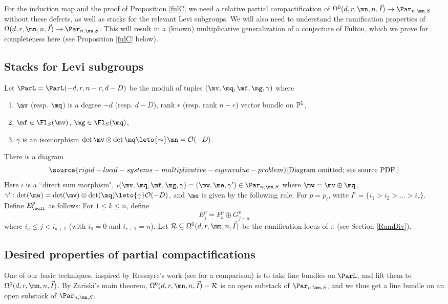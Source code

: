For the induction map and the proof of Proposition \ref{fulC} we need a relative
partial compactification of $\Omega^0(d,r,\mn,n,\vec{I})\to \Par_{n,\mn,S}$ without these defects, as well as stacks for the relevant Levi subgroups. We will also need to understand the ramification properties of $\Omega(d,r,\mn,n,\vec{I})\to \Par_{n,\mn,S}$.  This will result in a (known) multiplicative generalization of a conjecture of Fulton, which we prove for completeness here (see Proposition \ref{fulC} below).



\subsection{Stacks for Levi subgroups}
\begin{defi}
\notready\label{parul}
Let $\ParL=\ParL(-d,r,n-r,d-D)$ be the moduli of tuples $(\mv,\mq,\mf,\mg,\gamma)$ where
\begin{enumerate}
\item $\mv$ (resp. $\mq$) is a degree $-d$ (resp. $d-D$), rank $r$ (resp. rank $n-r$) vector bundle on $\Bbb{P}^1$,
\item  $\mf\in \Fl_S(\mv)$, $\mg\in \Fl_S(\mq)$,
\item $\gamma$ is an isomorphism $\det \mv\otimes \det\mq\leto{\sim}\mn=\mathcal{O}(-D)$.
\end{enumerate}
\end{defi}
There is a diagram
\begin{equation}\label{Dbasic}
\source{rigid-local-systems-multiplicative-eigenvalue-problem}
\text{[Diagram omitted; see source PDF.]}
\end{equation}
Here $i$ is a ``direct sum morphism", $i(\mv,\mq,\mf,\mg,\gamma)= (\mw,\me,\gamma')\in \Par_{n,\mn,S}$ where $\mw=\mv\oplus\mq$, $\gamma': \det(\mw)=\det(\mv)\otimes\det(\mq)\leto{\gamma} \mathcal{O}(-D)$, and $\me$ is given by the following rule. For $p=p_i$, write $I^i=\{i_1>i_2>\dots>i_r\}$. Define $E^p_{\bull}$ as follows: For  $1\leq k\leq n$, define
$$E^p_{j}=F^p_{a}\oplus G^p_{j-a}$$
where  $i_a\leq j <i_{a+1}$ (with $i_0=0$ and $i_{r+1}=n$). Let $\mathcal{R}\subseteq  \Omega^0(d,r,\mn,n,\vec{I})$ be the ramification locus of $\pi$ (see Section \ref{RamDiv}).

\subsection{Desired properties of partial compactifications}
One of our basic techniques, inspired by Ressayre's work \cite[Section 4.1]{R1} (see \cite[Section 8.6]{BHermit} for a comparison)  is to take line bundles on $\ParL$, and lift them to $\Omega^0(d,r,\mn,n,\vec{I})$.  By Zariski's main theorem, $\Omega^0(d,r,\mn,n,\vec{I})-\mathcal{R}$ is an open substack of $\Par_{n,\mn,S} $, and we thus get a line bundle on an open substack of $\Par_{n,\mn,S} $.

